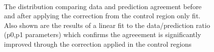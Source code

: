 \begin{figure}[tbhp]
\begin{center}
        \\
        \caption{The \njet distribution comparing data and prediction agreement before and after applying the correction from the control region only fit. Also shown are the results of a linear fit to the data/prediction ratio (p0,p1 parameters) which confirms the agreeement is significantly improved through the correction applied in the control regions}
    \end{center}
\end{figure}
